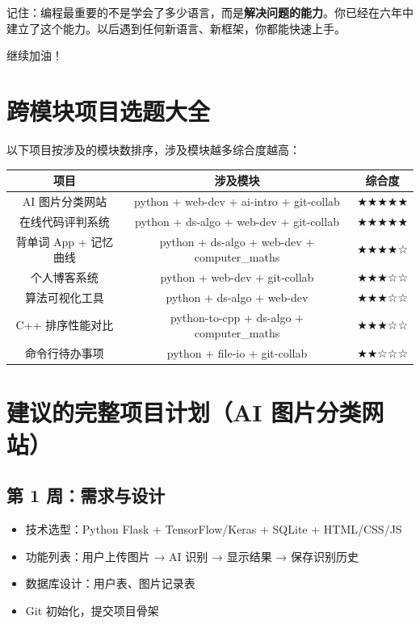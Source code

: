 \documentclass[a4paper,12pt]{ctexart}
\begin{document}
记住：编程最重要的不是学会了多少语言，而是\textbf{解决问题的能力}。你已经在六年中建立了这个能力。以后遇到任何新语言、新框架，你都能快速上手。

继续加油！

\section*{跨模块项目选题大全}

以下项目按涉及的模块数排序，涉及模块越多综合度越高：

\begin{center}
\begin{tabular}{|c|c|c|}
\hline
\textbf{项目} & \textbf{涉及模块} & \textbf{综合度} \\ \hline
AI 图片分类网站 & python + web-dev + ai-intro + git-collab & ★★★★★ \\ \hline
在线代码评判系统 & python + ds-algo + web-dev + git-collab & ★★★★★ \\ \hline
背单词 App + 记忆曲线 & python + ds-algo + web-dev + computer\_maths & ★★★★☆ \\ \hline
个人博客系统 & python + web-dev + git-collab & ★★★☆☆ \\ \hline
算法可视化工具 & python + ds-algo + web-dev & ★★★☆☆ \\ \hline
C++ 排序性能对比 & python-to-cpp + ds-algo + computer\_maths & ★★★☆☆ \\ \hline
命令行待办事项 & python + file-io + git-collab & ★★☆☆☆ \\ \hline
\end{tabular}
\end{center}

\section*{建议的完整项目计划（AI 图片分类网站）}

\subsection*{第 1 周：需求与设计}

\begin{itemize}
  \item 技术选型：Python Flask + TensorFlow/Keras + SQLite + HTML/CSS/JS
  \item 功能列表：用户上传图片 → AI 识别 → 显示结果 → 保存识别历史
  \item 数据库设计：用户表、图片记录表
  \item Git 初始化，提交项目骨架
\end{itemize}
\end{document}
